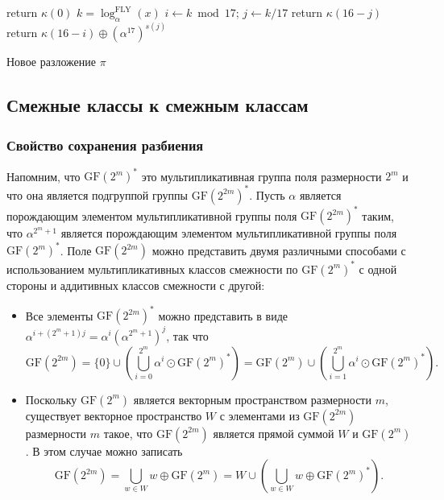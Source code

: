 \begin{algorithm}[htp!]
     {
      return $\kappa(0)$\;
    }{
      $k = \log_{\alpha}^{\text{FLY}}(x)$\;
      $i \gets k \bmod 17$; \quad $j \gets k/17 $ 
       { 
        return $\kappa(16 - j)$ 
      }{
        return $\kappa(16 - i) \oplus (\alpha^{17})^{s(j)}$ 
      }
    }
  \caption{Новое разложение \(\pi\)}
  \label{alg:alg01}
\end{algorithm}

\subsection{Смежные классы к смежным классам}

\subsubsection{Свойство сохранения разбиения}

Напомним, что \(\mathrm{GF}(2^m)^*\) это мультипликативная группа поля размерности \(2^m\) и что она является подгруппой группы \(\mathrm{GF}(2^{2m})^*\). Пусть \(\alpha\) является порождающим элементом мультипликативной группы поля \(\mathrm{GF}(2^{2m})^*\) таким, что \(\alpha^{2^m+1}\) является порождающим элементом мультипликативной группы поля \(\mathrm{GF}(2^m)^*\). Поле \(\mathrm{GF}(2^{2m})\) можно представить двумя различными способами с использованием мультипликативных классов смежности по \(\mathrm{GF}(2^m)^*\) с одной стороны и аддитивных классов смежности с другой:

\begin{itemize}
  \item Все элементы \(\mathrm{GF}(2^{2m})^*\) можно представить в виде \(\alpha^{i+(2^m+1)j} = \alpha^i (\alpha^{2^m+1})^j\), так что
  \[
  \mathrm{GF}(2^{2m}) = \{0\} \cup \left(\bigcup_{i=0}^{2^m} \alpha^i \odot \mathrm{GF}(2^m)^*\right) = \mathrm{GF}(2^m) \cup \left(\bigcup_{i=1}^{2^m} \alpha^i \odot \mathrm{GF}(2^m)^*\right).
  \]
  \item Поскольку \(\mathrm{GF}(2^m)\) является векторным пространством размерности \(m\), существует векторное пространство \(W\) с элементами из \(\mathrm{GF}(2^{2m})\) размерности \(m\) такое, что \(\mathrm{GF}(2^{2m})\) является прямой суммой \(W\) и \(\mathrm{GF}(2^m)\). В этом случае можно записать
  \[
  \mathrm{GF}(2^{2m}) = \bigcup_{w \in W} w \oplus \mathrm{GF}(2^m) = W \cup \left(\bigcup_{w \in W} w \oplus \mathrm{GF}(2^m)^*\right).
  \]
\end{itemize}

